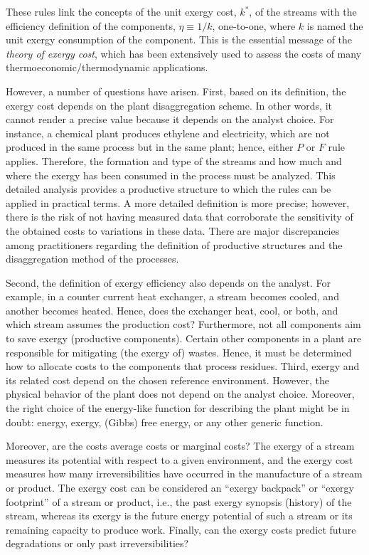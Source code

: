 \documentclass[energies,article,submit,moreauthors,pdftex]{Definitions/mdpi}
\begin{document}
These rules link  the concepts of the unit exergy cost, $k^*$, of the streams with the efficiency definition of the components, $\eta \equiv 1/k$, one-to-one, where $k$ is named the unit exergy consumption of the component. This is the essential message of the \emph{theory of exergy cost}, which has been extensively used to assess the costs of many thermoeconomic/thermodynamic applications.

However, a number of questions have arisen. First, based on its definition, the exergy cost depends on the plant disaggregation scheme. In other words, it cannot render a precise value because it depends on the analyst choice. For instance, a chemical plant produces ethylene and electricity, which are not produced in the same process but in the same plant; hence, either $P$ or $F$ rule applies. Therefore, the formation and type of the streams and how much and where the exergy has been consumed in the process must be analyzed. This detailed analysis provides a productive structure to which the rules can be applied in practical terms. A more detailed definition is more precise; however, there is the risk of not having measured data that corroborate the sensitivity of the obtained costs to variations in these data. There are major discrepancies among practitioners regarding the definition of productive structures and the disaggregation method of the processes.

Second, the definition of exergy efficiency also depends on the analyst. For example, in a counter current heat exchanger, a stream becomes cooled, and another becomes heated. Hence, does the exchanger heat, cool, or both, and which stream assumes the production cost? Furthermore, not all components aim to save exergy (productive components). Certain other components in a plant are responsible for mitigating (the exergy of) wastes. Hence, it must be determined how to allocate costs to the components that process residues.
Third, exergy and its related cost depend on the chosen reference environment. However, the physical behavior of the plant does not depend on the analyst choice. Moreover, the right choice of the energy-like function for describing the plant might be in doubt: energy, exergy, (Gibbs) free energy, or any other generic function. 

Moreover, are the costs average costs or marginal costs? The exergy of a stream measures its potential with respect to a given environment, and the exergy cost measures how many irreversibilities have occurred in the manufacture of a stream or product. The exergy cost can be considered an “exergy backpack” or “exergy footprint” of a stream or product, i.e., the past exergy synopsis (history) of the stream, whereas its exergy is the future energy potential of such a stream or its remaining capacity to produce work. Finally, can the exergy costs predict future degradations or only past irreversibilities?
\end{document}
